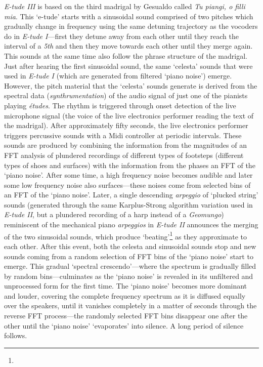 \emph{E-tude III} is based on the third madrigal by Gesualdo called \emph{Tu piangi, o filli mia}. This `e-tude' starts with a sinusoidal sound comprised of two pitches which gradually change in frequency using the same detuning trajectory as the vocoders do in \emph{E-tude I}---first they detune away from each other until they reach the interval of a \emph{5th} and then they move towards each other until they merge again. This sounds at the same time also follow the phrase structure of the madrigal. Just after hearing the first sinusoidal sound, the same `celesta' sounds that were used in \emph{E-tude I} (which are generated from filtered `piano noise') emerge. However, the pitch material that the `celesta' sounds generate is derived from the spectral data (\emph{synthrumentation}) of the audio signal of just one of the pianists playing \emph{\'{e}tudes}. The rhythm is triggered through onset detection of the live microphone signal (the voice of the live electronics performer reading the text of the madrigal). After approximately fifty seconds, the live electronics performer triggers percussive sounds with a Midi controller at periodic intervals. These sounds are produced by combining the information from the magnitudes of an FFT analysis of plundered recordings of different types of footsteps (different types of shoes and surfaces) with the information from the phases an FFT of the `piano noise'. After some time, a high frequency noise becomes audible and later some low frequency noise also surfaces---these noises come from selected bins of an FFT of the `piano noise'. Later, a single descending \emph{arpeggio} of `plucked string' sounds (generated through the same Karplus-Strong algorithm variation used in \emph{E-tude II}, but a plundered recording of a harp instead of a \emph{Geomungo}) reminiscent of the mechanical piano \emph{arpeggios} in \emph{E-tude II} announces the merging of the two sinusoidal sounds, which produce `beating'\footnote{} as they approximate to each other. After this event, both the celesta and sinusoidal sounds stop and new sounds coming from a random selection of FFT bins of the `piano noise' start to emerge. This gradual `spectral crescendo'---where the spectrum is gradually filled by random bins---culminates as the `piano noise' is revealed in its unfiltered and unprocessed form for the first time. The `piano noise' becomes more dominant and louder, covering the complete frequency spectrum as it is diffused equally over the speakers, until it vanishes completely in a matter of seconds through the reverse FFT process---the randomly selected FFT bins disappear one after the other until the `piano noise' `evaporates' into silence. A long period of silence follows. 

